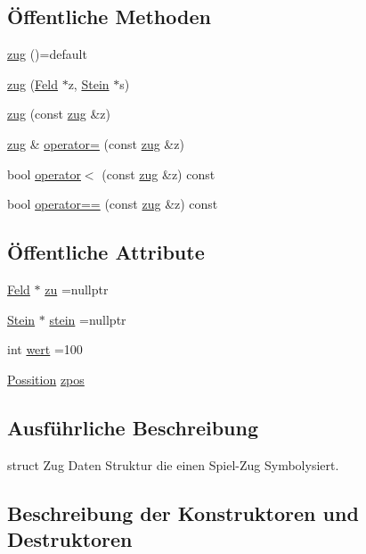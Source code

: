 \subsection*{Öffentliche Methoden}
\begin{DoxyCompactItemize}
\item 
\hyperlink{structzug_ad28714c8da822cfa7324650d90e30947}{zug} ()=default
\item 
\hyperlink{structzug_ab089a9829071c1c2a242cef95b399e39}{zug} (\hyperlink{class_feld}{Feld} $\ast$z, \hyperlink{class_stein}{Stein} $\ast$s)
\item 
\hyperlink{structzug_aa390b6ca5a719bb107a66bd6ddb728f6}{zug} (const \hyperlink{structzug}{zug} \&z)
\item 
\hyperlink{structzug}{zug} \& \hyperlink{structzug_aee196f37d4c013c82c89715a09e63d75}{operator=} (const \hyperlink{structzug}{zug} \&z)
\item 
bool \hyperlink{structzug_afd3240046f4e7e9fb7495b1eee259d35}{operator$<$} (const \hyperlink{structzug}{zug} \&z) const 
\item 
bool \hyperlink{structzug_a5676590b96c8d14da3ca588718af33d7}{operator==} (const \hyperlink{structzug}{zug} \&z) const 
\end{DoxyCompactItemize}
\subsection*{Öffentliche Attribute}
\begin{DoxyCompactItemize}
\item 
\hyperlink{class_feld}{Feld} $\ast$ \hyperlink{structzug_aa1d47432b331308a510572187bfbe0ec}{zu} =nullptr
\item 
\hyperlink{class_stein}{Stein} $\ast$ \hyperlink{structzug_a4b431b73a9dbcfd9b2c20afb66f76998}{stein} =nullptr
\item 
int \hyperlink{structzug_adea5273c99ffd5fb46a9f5367a0fef3e}{wert} =100
\item 
\hyperlink{struct_possition}{Possition} \hyperlink{structzug_a849eec23abc7f17b4241197f48683bc8}{zpos}
\end{DoxyCompactItemize}


\subsection{Ausführliche Beschreibung}
struct Zug Daten Struktur die einen Spiel-\/\+Zug Symbolysiert. 

\subsection{Beschreibung der Konstruktoren und Destruktoren}
\hypertarget{structzug_ad28714c8da822cfa7324650d90e30947}{}
